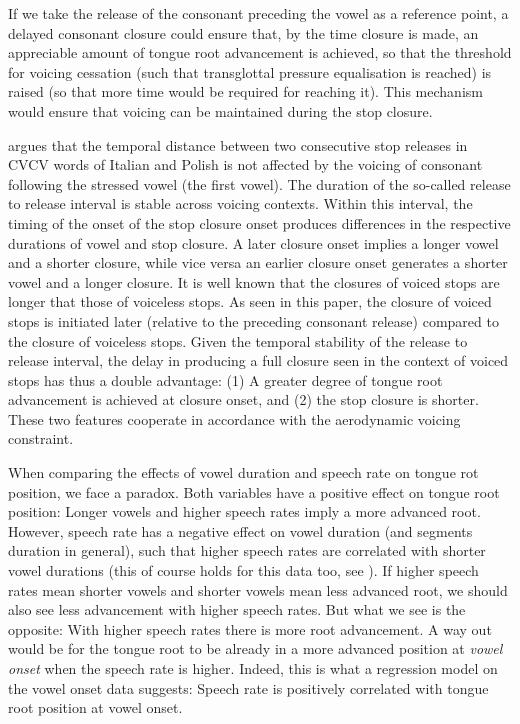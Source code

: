 \documentclass[12pt,]{article}
\begin{document}
If we take the release of the consonant preceding the vowel as a
reference point, a delayed consonant closure could ensure that, by the
time closure is made, an appreciable amount of tongue root advancement
is achieved, so that the threshold for voicing cessation (such that
transglottal pressure equalisation is reached) is raised (so that more
time would be required for reaching it). This mechanism would ensure
that voicing can be maintained during the stop closure.

\citet{coretta2018j} argues that the temporal distance between two
consecutive stop releases in CVCV words of Italian and Polish is not
affected by the voicing of consonant following the stressed vowel (the
first vowel). The duration of the so-called release to release interval
is stable across voicing contexts. Within this interval, the timing of
the onset of the stop closure onset produces differences in the
respective durations of vowel and stop closure. A later closure onset
implies a longer vowel and a shorter closure, while vice versa an
earlier closure onset generates a shorter vowel and a longer closure. It
is well known that the closures of voiced stops are longer that those of
voiceless stops. As seen in this paper, the closure of voiced stops is
initiated later (relative to the preceding consonant release) compared
to the closure of voiceless stops. Given the temporal stability of the
release to release interval, the delay in producing a full closure seen
in the context of voiced stops has thus a double advantage: (1) A
greater degree of tongue root advancement is achieved at closure onset,
and (2) the stop closure is shorter. These two features cooperate in
accordance with the aerodynamic voicing constraint.

When comparing the effects of vowel duration and speech rate on tongue
rot position, we face a paradox. Both variables have a positive effect
on tongue root position: Longer vowels and higher speech rates imply a
more advanced root. However, speech rate has a negative effect on vowel
duration (and segments duration in general), such that higher speech
rates are correlated with shorter vowel durations (this of course holds
for this data too, see \citealt{coretta2018j}). If higher speech rates
mean shorter vowels and shorter vowels mean less advanced root, we
should also see less advancement with higher speech rates. But what we
see is the opposite: With higher speech rates there is more root
advancement. A way out would be for the tongue root to be already in a
more advanced position at \emph{vowel onset} when the speech rate is
higher. Indeed, this is what a regression model on the vowel onset data
suggests: Speech rate is positively correlated with tongue root position
at vowel onset.
\end{document}
